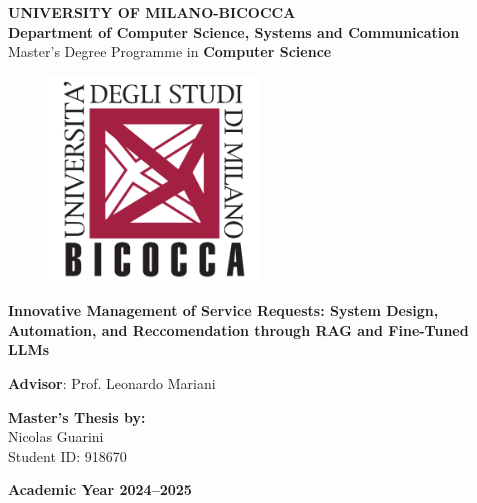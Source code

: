 \begin{titlepage}

\begin{center}
    \normalsize{\textbf{UNIVERSITY OF MILANO-BICOCCA}} \\
    \vspace{3mm}
    \normalsize{\textbf{Department of Computer Science, Systems and Communication}} \\
    \vspace{3mm}
    \normalsize{Master's Degree Programme in \textbf{Computer Science}} \\
    \vspace{13mm}
\end{center}

\begin{figure}[!htb]
    \centering
    \includegraphics[width=5.6cm]{images/logo bicocca.png}
\end{figure}

\vspace{20mm}
\begin{center}

    \Large{\textbf{Innovative Management of Service Requests: System Design, Automation, and Reccomendation through RAG and Fine-Tuned LLMs}}
\end{center}

\vspace*{\fill}

\begin{flushleft}
    \textbf{Advisor}: Prof. Leonardo Mariani
\end{flushleft}

\vspace{10mm}

\begin{flushright}
    \textbf{Master’s Thesis by:} \\
    Nicolas Guarini \\
    Student ID: 918670
\end{flushright}

\vspace{15mm}

\begin{center}
    \normalsize{\textbf{Academic Year 2024–2025}}
\end{center}

\end{titlepage}
